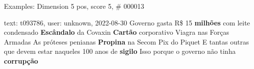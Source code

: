 \begin{frame}{Examples: Dimension 5 pos, score 5, \# 000013}
\footnotesize
\begin{exampleblock}{text: t093786, user: unknown, 2022-08-30}
Governo gasta R\$ 15 \textbf{milhões} com leite condensado \textbf{Escândalo} 
da Covaxin \textbf{Cartão} corporativo Viagra nas Forças Armadas As próteses 
penianas \textbf{Propina} na Secom Pix do Piquet E tantas outras que devem 
estar naqueles 100 anos de \textbf{sigilo} Isso porque o governo não tinha 
\textbf{corrupção} 
\end{exampleblock}
\end{frame}

